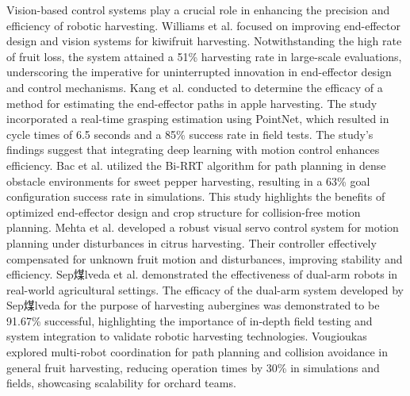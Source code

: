 \documentclass[a4paper,fleqn]{cas-dc}
\begin{document}
Vision-based control systems play a crucial role in enhancing the precision and efficiency of robotic harvesting. 
Williams et al.\cite{williams2020improvements} focused on improving end-effector design and vision systems for kiwifruit harvesting. Notwithstanding the high rate of fruit loss, the system attained a 51\% harvesting rate in large-scale evaluations, underscoring the imperative for uninterrupted innovation in end-effector design and control mechanisms. Kang et al.\cite{kang2020real} conducted to determine the efficacy of a method for estimating the end-effector paths in apple harvesting. The study incorporated a real-time grasping estimation using PointNet, which resulted in cycle times of 6.5 seconds and a 85\% success rate in field tests. The study's findings suggest that integrating deep learning with motion control enhances efficiency.
Bac et al.\cite{bac2016analysis} utilized the Bi-RRT algorithm for path planning in dense obstacle environments for sweet pepper harvesting, resulting in a 63\% goal configuration success rate in simulations. This study highlights the benefits of optimized end-effector design and crop structure for collision-free motion planning. Mehta et al.\cite{mehta2016robust} developed a robust visual servo control system for motion planning under disturbances in citrus harvesting. Their controller effectively compensated for unknown fruit motion and disturbances, improving stability and efficiency.
Sep煤lveda et al.\cite{sepulveda2020robotic} demonstrated the effectiveness of dual-arm robots in real-world agricultural settings. The efficacy of the dual-arm system developed by Sep煤lveda for the purpose of harvesting aubergines was demonstrated to be 91.67\% successful, highlighting the importance of in-depth field testing and system integration to validate robotic harvesting technologies. Vougioukas\cite{vougioukas2019orchestra} explored multi-robot coordination for path planning and collision avoidance in general fruit harvesting, reducing operation times by 30\% in simulations and fields, showcasing scalability for orchard teams.

\end{document}
